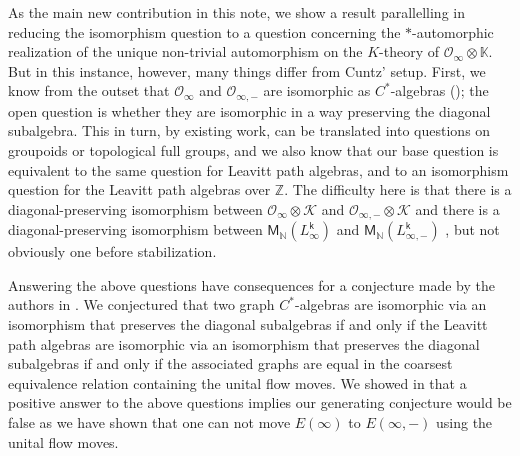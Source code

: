 \documentclass[11pt, letterpaper,final]{amsart}
\theoremstyle{definition}
\theoremstyle{remark}
\begin{document}
As the main new contribution in this note, we show a result parallelling \cite{C86} in reducing the isomorphism question to a question concerning the $*$-automorphic realization of the unique non-trivial automorphism on the $K$-theory of $\mathcal O_\infty\otimes\mathbb K$. But in this instance, however, many things differ from Cuntz' setup. First, we know from the outset that $\mathcal O_\infty$ and $\mathcal O_{\infty,-}$ are isomorphic as $C^*$-algebras (\cite{ERRSMathAnnalen, ER-Refined}); the open question is whether they are isomorphic in a way preserving the diagonal subalgebra. This in turn, by existing work, can be translated into questions on groupoids or topological full groups, and we also know that our base question is equivalent to the same question for Leavitt path algebras, and to an isomorphism question for the Leavitt path algebras over $\mathbb Z$.  The difficulty here is that there is a diagonal-preserving isomorphism between $\mathcal O_\infty \otimes \mathcal{K}$ and $\mathcal O_{\infty,-} \otimes \mathcal{K}$ and there is a diagonal-preserving isomorphism between $\mathsf{M}_\mathbb{N}(L_\infty^{\mathsf{k}})$ and $\mathsf{M}_\mathbb{N}(L_{\infty,-}^{\mathsf{k}})$ \cite{Sor13, RT13,ER-Refined}, but not obviously one before stabilization.

Answering the above questions have consequences for a conjecture made by the authors in \cite{ER-Refined}.  We conjectured that two graph $C^*$-algebras are isomorphic via an isomorphism that preserves the diagonal subalgebras if and only if the Leavitt path algebras are isomorphic via an isomorphism that preserves the diagonal subalgebras if and only if the associated graphs are equal in the coarsest equivalence relation containing the unital flow moves.  We showed in \cite{ER-Refined} that a positive answer to the above questions implies our generating conjecture would be false as we have shown that one can not move $E(\infty)$ to $E(\infty, -)$ using the unital flow moves.
\end{document}
